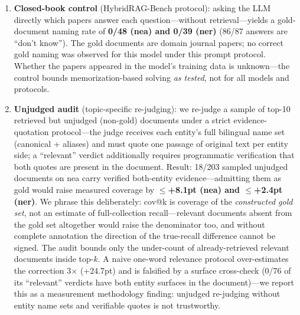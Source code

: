 \documentclass[sigconf,nonacm]{acmart}
\begin{document}
\begin{enumerate}
\item \textbf{Closed-book control} (HybridRAG-Bench protocol): asking the LLM
directly which papers answer each question---without retrieval---yields a
gold-document naming rate of \textbf{0/48 (nea) and 0/39 (ner)} (86/87
answers are ``don't know''). The gold documents are domain journal papers; no correct gold naming
was observed for this model under this prompt protocol. Whether the
papers appeared in the model's training data is unknown---the control
bounds memorization-based solving \emph{as tested}, not for all models
and protocols.

\item \textbf{Unjudged audit} (topic-specific re-judging): we re-judge a
sample of top-10 retrieved but unjudged (non-gold) documents under a strict
evidence-quotation protocol---the judge receives each entity's full
bilingual name set (canonical + aliases) and must quote one passage of
original text per entity side; a ``relevant'' verdict additionally requires
programmatic verification that both quotes are present in the document.
Result: 18/203 sampled unjudged documents on nea carry verified both-entity
evidence---admitting them as gold would raise measured coverage by
\textbf{$\leq$+8.1pt (nea) and $\leq$+2.4pt (ner)}. We phrase this
deliberately: cov@k is coverage of the \emph{constructed gold set}, not an
estimate of full-collection recall---relevant documents absent from the gold
set altogether would raise the denominator too, and without complete
annotation the direction of the true-recall difference cannot be signed.
The audit bounds only the under-count of already-retrieved relevant
documents inside top-$k$. A naive one-word relevance
protocol over-estimates the correction 3$\times$ (+24.7pt) and is falsified
by a surface cross-check (0/76 of its ``relevant'' verdicts have both entity
surfaces in the document)---we report this as a measurement methodology
finding: unjudged re-judging without entity name sets and verifiable quotes
is not trustworthy.


\end{enumerate}
\end{document}

